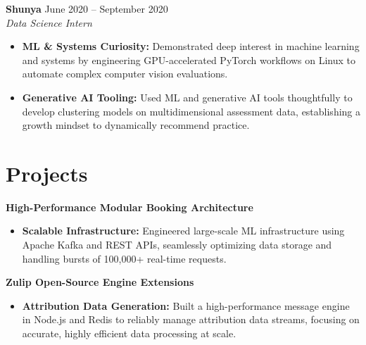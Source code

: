 \documentclass[11pt,a4paper]{article}
\begin{document}
\vspace{3pt}
\noindent
\textbf{Shunya} \hfill June 2020 -- September 2020 \\
\textit{Data Science Intern}
\begin{itemize}[leftmargin=*,noitemsep,topsep=0pt]
    \item \textbf{ML \& Systems Curiosity:} Demonstrated deep interest in machine learning and systems by engineering GPU-accelerated PyTorch workflows on Linux to automate complex computer vision evaluations.
    \item \textbf{Generative AI Tooling:} Used ML and generative AI tools thoughtfully to develop clustering models on multidimensional assessment data, establishing a growth mindset to dynamically recommend practice.
\end{itemize}

\vspace{-5pt}
\section{Projects}
\noindent
\textbf{High-Performance Modular Booking Architecture}
\begin{itemize}[leftmargin=*,noitemsep,topsep=0pt]
    \item \textbf{Scalable Infrastructure:} Engineered large-scale ML infrastructure using Apache Kafka and REST APIs, seamlessly optimizing data storage and handling bursts of 100,000+ real-time requests.
\end{itemize}

\vspace{3pt}
\noindent
\textbf{Zulip Open-Source Engine Extensions}
\begin{itemize}[leftmargin=*,noitemsep,topsep=0pt]
    \item \textbf{Attribution Data Generation:} Built a high-performance message engine in Node.js and Redis to reliably manage attribution data streams, focusing on accurate, highly efficient data processing at scale.
\end{itemize}
\end{document}
